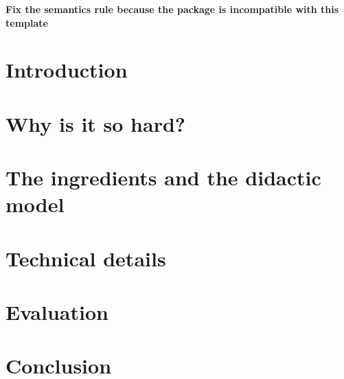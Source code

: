 \documentclass[sigconf]{acmart}
\begin{document}




\maketitle

\textbf{\Huge{Fix the semantics rule because the package is incompatible with this template}}

\section{Introduction}
\label{sec:introduction}


\section{Why is it so hard?}
\label{sec:problem}


\section{The ingredients and the didactic model}
\label{sec:solution}


\section{Technical details}
\label{sec:technical_details}



\section{Evaluation}
\label{sec:evaluation}


\section{Conclusion}
\label{sec:conclusion}



 
\end{document}
